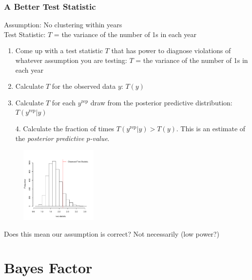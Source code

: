 \documentclass{beamer}
\begin{document}
\begin{frame}
\frametitle{A Better Test Statistic}
\pause
Assumption: No clustering within years\\
\pause
\bigskip
Test Statistic: $T$ = the variance of the number of 1s in each year
\end{frame}

\begin{frame}[fragile]
\begin{enumerate}
\item Come up with a test statistic $T$ that has power to diagnose
violations of whatever assumption you are testing: \pause  $T$ = the variance of the number of 1s in each year
\medskip
\pause
\item Calculate $T$ for the observed data $y$: \pause $T(y)$
\medskip
\pause
\tiny
\pause
\medskip
\normalsize 
\item Calculate $T$ for each $y^{\mathrm{rep}}$ draw from the
posterior predictive distribution: \pause $T(y^{\mathrm{rep}} | y)$
\medskip
\pause
\tiny
\end{enumerate}
\normalsize 
\end{frame}

\begin{frame}[fragile]
\begin{enumerate}
\item[4.] Calculate the fraction of times $T(y^{\mathrm{rep}} | y) >
T(y)$.  \pause  This is an estimate of the \textit{posterior
predictive $p$-value}. 
\medskip
\pause
\tiny
\end{enumerate}
\begin{figure}[!htp]
\includegraphics[width = 1.5in, height=1.5in]{modelcheck-yearhist.pdf}
\end{figure}
\normalsize
\pause
Does this mean our assumption is correct?  \pause Not necessarily (low
power?)
\end{frame}

\section{Bayes Factor}
\end{document}

